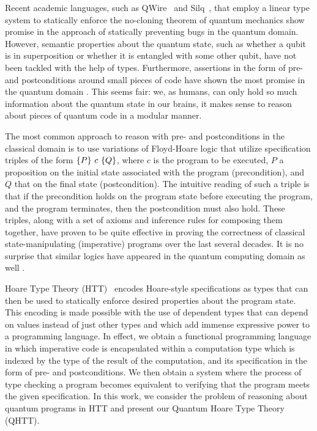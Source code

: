 Recent academic languages, such as QWire~\parencite{qwire2017,paykin2018} and Silq~\parencite{silq20}, that employ a linear type system to statically enforce the no-cloning theorem of quantum mechanics show promise in the approach of statically preventing bugs in the quantum domain. However, semantic properties about the quantum state, such as whether a qubit is in superposition or whether it is entangled with some other qubit, have not been tackled with the help of types. Furthermore, assertions in the form of pre- and postconditions around small pieces of code have shown the most promise in the quantum domain \parencite{huang2019,qdb2018}. This seems fair: we, as humans, can only hold so much information about the quantum state in our brains, it makes sense to reason about pieces of quantum code in a modular manner.

The most common approach to reason with pre- and postconditions in the classical domain is to use variations of Floyd-Hoare logic that utilize specification triples of the form $\{P\} ~c~ \{Q\}$, where $c$ is the program to be executed, $P$ a proposition on the initial state associated with the program (precondition), and $Q$ that on the final state (postcondition). The intuitive reading of such a triple is that if the precondition holds on the program state before executing the program, and the program terminates, then the postcondition must also hold. These triples, along with a set of axioms and inference rules for composing them together, have proven to be quite effective in proving the correctness of classical state-manipulating (imperative) programs over the last several decades. It is no surprise that similar logics have appeared in the quantum computing domain as well \parencite{aqhl2019,floydhoare2012,unruh2019,wpe2016}.

Hoare Type Theory (HTT)~\parencite{nanevski2008} encodes Hoare-style specifications as types that can then be used to statically enforce desired properties about the program state. This encoding is made possible with the use of dependent types that can depend on values instead of just other types and which add immense expressive power to a programming language. In effect, we obtain a functional programming language in which imperative code is encapsulated within a computation type which is indexed by the type of the result of the computation, and its specification in the form of pre- and postconditions. We then obtain a system where the process of type checking a program becomes equivalent to verifying that the program meets the given specification. In this work, we consider the problem of reasoning about quantum programs in HTT and present our Quantum Hoare Type Theory (QHTT).

